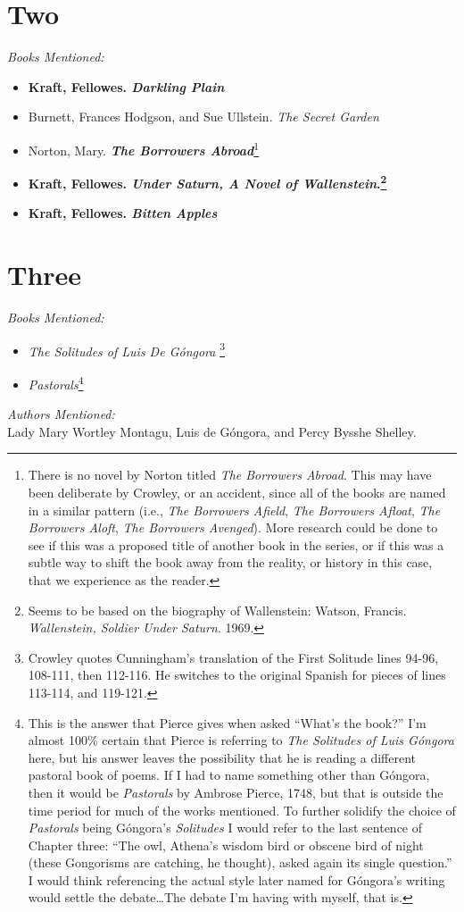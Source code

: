 \documentclass[12pt,makeidx]{extreport}
\begin{document}
\section{Two}
\textit{Books Mentioned:}
\begin{itemize}
\item \textbf{Kraft, Fellowes. \textit{Darkling Plain}} \cite{Kraft}
\item Burnett, Frances Hodgson, and Sue Ullstein. \textit{The Secret Garden} \cite{Burnett1975}
\item Norton, Mary. \textbf{\textit{The Borrowers Abroad}}\footnote{There is no novel by Norton titled \textit{The Borrowers Abroad}. This may have been deliberate by Crowley, or an accident, since all of the books are named in a similar pattern (i.e., \textit{The Borrowers Afield}, \textit{The Borrowers Afloat}, \textit{The Borrowers Aloft}, \textit{The Borrowers Avenged}). More research could be done to see if this was a proposed title of another book in the series, or if this was a subtle way to shift the book away from the reality, or history in this case, that we experience as the reader.} \cite{Norton}
\item \textbf{Kraft, Fellowes. \textit{Under Saturn, A Novel of Wallenstein}.\footnote{Seems to be based on the biography of Wallenstein: Watson, Francis. \textit{Wallenstein, Soldier Under Saturn}. 1969.}} \cite{Krafta}
\item \textbf{Kraft, Fellowes. \textit{Bitten Apples}} \cite{Kraftb}
\end{itemize}

\section{Three}
\textit{Books Mentioned:}
\begin{itemize}
\item \textit{The Solitudes of Luis De Góngora} \cite{DeGongoraYArgote1968}\footnote{Crowley quotes Cunningham's translation of the First Solitude lines 94-96, 108-111, then 112-116. He switches to the original Spanish for pieces of lines 113-114, and 119-121.}
\item \textit{Pastorals}\footnote{This is the answer that Pierce gives when asked ``What's the book?'' I'm almost 100\% certain that Pierce is referring to \textit{The Solitudes of Luis Góngora} here, but his answer leaves the possibility that he is reading a different pastoral book of poems. If I had to name something other than Góngora, then it would be \textit{Pastorals} by Ambrose Pierce, 1748, but that is outside the time period for much of the works mentioned. To further solidify the choice of \textit{Pastorals} being Góngora's \textit{Solitudes} I would refer to the last sentence of Chapter three: ``The owl, Athena's wisdom bird or obscene bird of night (these Gongorisms are catching, he thought), asked again its single question.'' I would think referencing the actual style later named for Góngora's writing would settle the debate\ldots The debate I'm having with myself, that is.}
\end{itemize}
\textit{Authors Mentioned:}\\
Lady Mary Wortley Montagu, Luis de Góngora, and Percy Bysshe Shelley.
\end{document}
